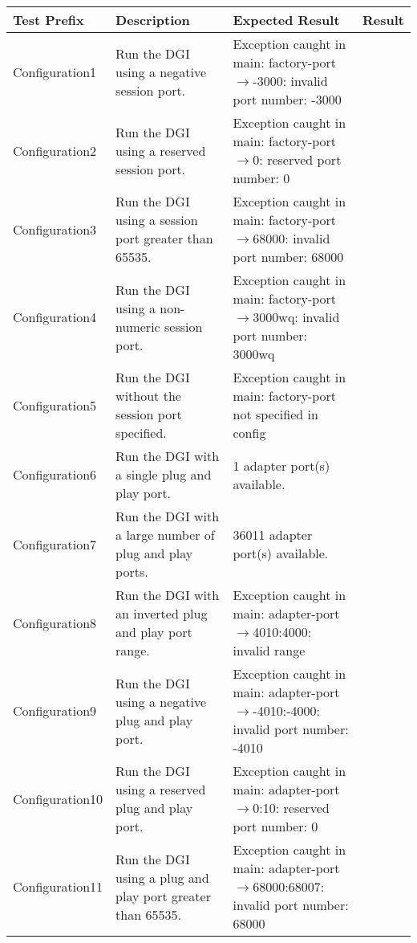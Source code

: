 \documentclass{article}
\begin{document}
\begin{center}
\begin{footnotesize}
\begin{longtable}{|p{3cm}|p{4cm}|p{10cm}|c|}
    \hline
    Test Prefix & Description & Expected Result & Result \\ \hline \endhead \hline \endfoot
    Configuration1 & Run the DGI using a negative session port. & Exception caught in main: factory-port$\rightarrow$-3000: invalid port number: -3000 & \\
    Configuration2 & Run the DGI using a reserved session port. & Exception caught in main: factory-port$\rightarrow$0: reserved port number: 0 & \\
    Configuration3 & Run the DGI using a session port greater than 65535. & Exception caught in main: factory-port$\rightarrow$68000: invalid port number: 68000 & \\
    Configuration4 & Run the DGI using a non-numeric session port. & Exception caught in main: factory-port$\rightarrow$3000wq: invalid port number: 3000wq & \\
    Configuration5 & Run the DGI without the session port specified. & Exception caught in main: factory-port not specified in config & \\
    Configuration6 & Run the DGI with a single plug and play port. & 1 adapter port(s) available. & \\
    Configuration7 & Run the DGI with a large number of plug and play ports. & 36011 adapter port(s) available. & \\
    Configuration8 & Run the DGI with an inverted plug and play port range. & Exception caught in main: adapter-port$\rightarrow$4010:4000: invalid range & \\
    Configuration9 & Run the DGI using a negative plug and play port. & Exception caught in main: adapter-port$\rightarrow$-4010:-4000: invalid port number: -4010 & \\
    Configuration10 & Run the DGI using a reserved plug and play port. & Exception caught in main: adapter-port$\rightarrow$0:10: reserved port number: 0 & \\
    Configuration11 & Run the DGI using a plug and play port greater than 65535. & Exception caught in main: adapter-port$\rightarrow$68000:68007: invalid port number: 68000 & \\

\end{longtable}
\end{footnotesize}
\end{center}
\end{document}
